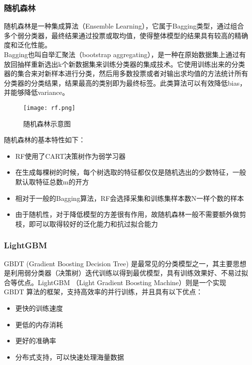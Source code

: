\subsubsection{随机森林}
随机森林\cite{rf}是一种集成算法（Ensemble Learning），它属于Bagging类型，通过组合多个弱分类器，最终结果通过投票或取均值，使得整体模型的结果具有较高的精确度和泛化性能。\\

Bagging也叫自举汇聚法（bootstrap aggregating），是一种在原始数据集上通过有放回抽样重新选出k个新数据集来训练分类器的集成技术。它使用训练出来的分类器的集合来对新样本进行分类，然后用多数投票或者对输出求均值的方法统计所有分类器的分类结果，结果最高的类别即为最终标签。此类算法可以有效降低bias，并能够降低variance。

\begin{figure}[H]
    \centering
    \texttt{[image: rf.png]}
    \caption{随机森林示意图}
    \label{fig:rf}
\end{figure}

随机森林的基本特性如下：
\begin{itemize}
    \item RF使用了CART决策树作为弱学习器
    \item 在生成每棵树的时候，每个树选取的特征都仅仅是随机选出的少数特征，一般默认取特征总数m的开方
    \item 相对于一般的Bagging算法，RF会选择采集和训练集样本数N一样个数的样本
    \item 由于随机性，对于降低模型的方差很有作用，故随机森林一般不需要额外做剪枝，即可以取得较好的泛化能力和抗过拟合能力
\end{itemize}

\subsubsection{LightGBM}
GBDT (Gradient Boosting Decision Tree)\cite{lg} 是最常见的分类模型之一，其主要思想是利用弱分类器（决策树）迭代训练以得到最优模型，具有训练效果好、不易过拟合等优点。LightGBM （Light Gradient Boosting Machine）则是一个实现 GBDT 算法的框架，支持高效率的并行训练，并且具有以下优点：
\begin{itemize}
    \item 更快的训练速度
    \item 更低的内存消耗
    \item 更好的准确率
    \item 分布式支持，可以快速处理海量数据
\end{itemize}

